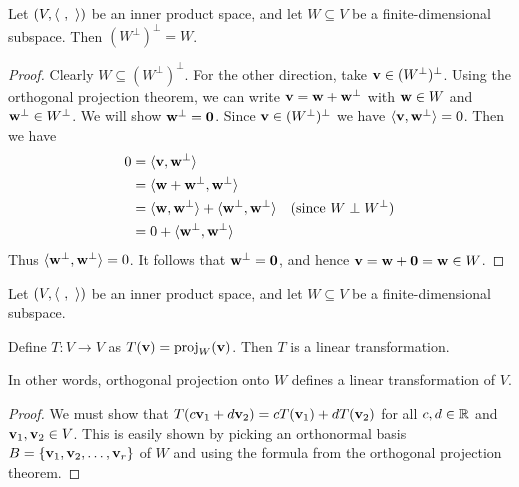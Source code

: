 \begin{frame}
 \begin{corollary}
Let $(V,\langle \ , \ \rangle)$ be an inner product space, and let $W\subseteq V$ be a finite-dimensional subspace. Then $(W^\perp)^\perp=W$. 
 \end{corollary} 
 \pause
 \begin{proof}
 Clearly $W\subseteq (W^\perp)^\perp$.
 \bspace 
 For the other direction, take ${\mathbf v}\in (W^\perp)^\perp$. Using the \alert{orthogonal projection theorem}, we can write ${\mathbf v}={\mathbf w}+{\mathbf w}^\perp$ with ${\mathbf w}\in W$ and ${\mathbf w}^\perp\in W^\perp$. We will show ${\mathbf w}^\perp={\mathbf 0}$. 
 \bpause 
 Since ${\mathbf v}\in (W^\perp)^\perp$ we have $\langle {\mathbf v},{\mathbf w}^\perp\rangle=0$. Then we have 
 \begin{align*}
  0&=\langle {\mathbf v},{\mathbf w}^\perp\rangle\\
  &=\langle {\mathbf w}+{\mathbf w}^\perp,{\mathbf w}^\perp\rangle\\
  &=\langle {\mathbf w},{\mathbf w}^\perp\rangle+\langle {\mathbf w}^\perp,{\mathbf w}^\perp\rangle &\text{(since $W\perp W^\perp$)}\\
  &=0+\langle {\mathbf w}^\perp,{\mathbf w}^\perp\rangle
 \end{align*} 
\pause Thus $\langle {\mathbf w}^\perp,{\mathbf w}^\perp\rangle=0$.
\bspace It follows that ${\mathbf w}^\perp={\mathbf 0}$, and hence ${\mathbf v}={\mathbf w}+{\mathbf 0}={\mathbf w}\in W$. 
 \end{proof} 
\end{frame} 
\begin{frame}
 \begin{corollary}
 Let $(V,\langle \ , \ \rangle)$ be an inner product space, and let $W\subseteq V$ be a finite-dimensional subspace. 
 
 \noindent
 Define $T\colon V\rightarrow V$ as $T({\mathbf v})=\mbox{proj}_{W}({{\mathbf v}})$. Then $T$ is a linear transformation. 
 
 \noindent
 In other words, orthogonal projection onto $W$ defines a linear transformation of $V$. 
 \end{corollary}
 \pause
 \begin{proof}
 We must show that $T(c{\mathbf v}_1+d{\mathbf v}_2)=cT({\mathbf v}_1)+dT({\mathbf v}_2)$ for all $c,d\in{\mathbb R}$ and ${\mathbf v}_1,{\mathbf v}_2\in V$.  This is easily shown by picking an orthonormal basis $B=\{{\mathbf v}_1,{\mathbf v}_2, \dots, {\mathbf v}_r\}$ of $W$ and using the formula from the orthogonal projection theorem. 
 \end{proof}
\end{frame}
